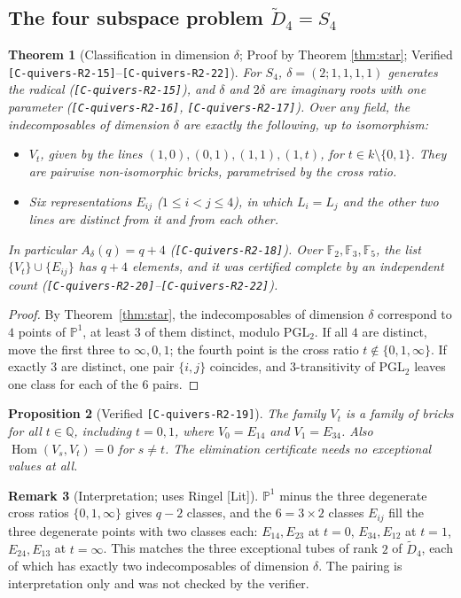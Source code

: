 \documentclass[11pt]{article}
\newtheorem{theorem}{Theorem}\newtheorem{proposition}[theorem]{Proposition}\newtheorem{corollary}[theorem]{Corollary}
\theoremstyle{definition}\newtheorem{definition}[theorem]{Definition}\newtheorem{remark}[theorem]{Remark}\newtheorem{observation}[theorem]{Numerical observation}
\newcommand{\C}[1]{\texttt{[C-#1]}}
\begin{document}
\subsection*{The four subspace problem $\widetilde D_4=S_4$}
\begin{theorem}[Classification in dimension $\delta$; Proof by Theorem \ref{thm:star}; Verified \C{quivers-R2-15}--\C{quivers-R2-22}]
For $S_4$, $\delta=(2;1,1,1,1)$ generates the radical (\C{quivers-R2-15}), and $\delta$ and $2\delta$ are imaginary roots with one parameter
(\C{quivers-R2-16}, \C{quivers-R2-17}). Over any field, the indecomposables of dimension $\delta$ are exactly the following, up to isomorphism:
\begin{itemize}
\item $V_t$, given by the lines $(1,0),(0,1),(1,1),(1,t)$, for $t\in k\setminus\{0,1\}$. They are pairwise non-isomorphic bricks, parametrised by the cross ratio.
\item Six representations $E_{ij}$ ($1\le i<j\le4$), in which $L_i=L_j$ and the other two lines are distinct from it and from each other.
\end{itemize}
In particular $A_\delta(q)=q+4$ (\C{quivers-R2-18}). Over $\mathbb F_2,\mathbb F_3,\mathbb F_5$, the list $\{V_t\}\cup\{E_{ij}\}$ has $q+4$ elements, and it was
certified complete by an independent count (\C{quivers-R2-20}--\C{quivers-R2-22}).
\end{theorem}
\begin{proof}
By Theorem~\ref{thm:star}, the indecomposables of dimension $\delta$ correspond to $4$ points of $\mathbb P^1$, at least $3$ of them distinct, modulo $\mathrm{PGL}_2$. If all $4$ are distinct,
move the first three to $\infty,0,1$; the fourth point is the cross ratio $t\notin\{0,1,\infty\}$. If exactly $3$ are distinct, one pair $\{i,j\}$
coincides, and $3$-transitivity of $\mathrm{PGL}_2$ leaves one class for each of the $6$ pairs.
\end{proof}
\begin{proposition}[Verified \C{quivers-R2-19}]
The family $V_t$ is a family of bricks for \emph{all} $t\in\mathbb Q$, including $t=0,1$, where $V_0=E_{14}$ and $V_1=E_{34}$. Also
$\operatorname{Hom}(V_s,V_t)=0$ for $s\neq t$. The elimination certificate needs no exceptional values at all.
\end{proposition}
\begin{remark}[Interpretation; uses Ringel {[Lit]}]
$\mathbb P^1$ minus the three degenerate cross ratios $\{0,1,\infty\}$ gives $q-2$ classes, and the $6=3\times2$ classes $E_{ij}$ fill the three
degenerate points with two classes each: $E_{14},E_{23}$ at $t=0$, $E_{34},E_{12}$ at $t=1$, $E_{24},E_{13}$ at $t=\infty$. This matches the three
exceptional tubes of rank $2$ of $\widetilde D_4$, each of which has exactly two indecomposables of dimension $\delta$. The pairing is
interpretation only and was not checked by the verifier.
\end{remark}
\end{document}
